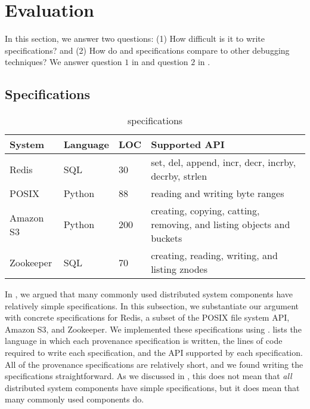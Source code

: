 \section{Evaluation}

In this section, we answer two questions: (1) How difficult is it to write
\watprovenance{} specifications? and (2) How do \watprovenance{} and
\watprovenance{} specifications compare to other debugging techniques?
We answer question $1$ in  and question $2$ in
.

\subsection{\WatProvenance{} Specifications}
\begin{table*}[t]
  \caption{\fluent{} \watprovenance{} specifications}
  \begin{tabular}{llll}
    \toprule
    System    & Language & LOC & Supported API                                                         \\\midrule
    Redis     & SQL      & 30  & set, del, append, incr, decr, incrby, decrby, strlen                  \\
    POSIX     & Python   & 88  & reading and writing byte ranges                                       \\
    Amazon S3 & Python   & 200 & creating, copying, catting, removing, and listing objects and buckets \\
    Zookeeper & SQL      & 70  & creating, reading, writing, and listing znodes                        \\
    \bottomrule
  \end{tabular}
\end{table*}

In , we argued that many commonly used distributed system
components have relatively simple \watprovenance{} specifications. In this
subsection, we substantiate our argument with concrete \watprovenance{}
specifications for Redis, a subset of the POSIX file system API, Amazon S3, and
Zookeeper. We implemented these \watprovenance{} specifications using
\fluent{}.  lists the language in which each provenance
specification is written, the lines of code required to write each
specification, and the API supported by each specification. All of the
provenance specifications are relatively short, and we found writing the
specifications straightforward. As we discussed in
, this does not mean that \emph{all}
distributed system components have simple \watprovenance{} specifications, but
it does mean that many commonly used components do.

